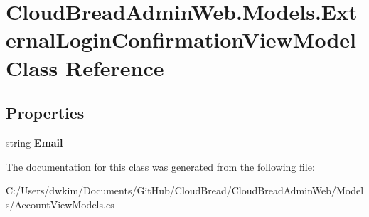 \hypertarget{a00075}{}\section{Cloud\+Bread\+Admin\+Web.\+Models.\+External\+Login\+Confirmation\+View\+Model Class Reference}
\label{a00075}
\subsection*{Properties}
\begin{DoxyCompactItemize}
\item 
string {\bfseries Email}\hypertarget{a00075_a2082e7aae001a613bf12bb05e0e52eea}{}\label{a00075_a2082e7aae001a613bf12bb05e0e52eea}

\end{DoxyCompactItemize}


The documentation for this class was generated from the following file\+:\begin{DoxyCompactItemize}
\item 
C\+:/\+Users/dwkim/\+Documents/\+Git\+Hub/\+Cloud\+Bread/\+Cloud\+Bread\+Admin\+Web/\+Models/Account\+View\+Models.\+cs\end{DoxyCompactItemize}
